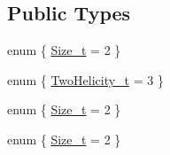 \subsection*{Public Types}
\begin{DoxyCompactItemize}
\item 
enum \{ \mbox{\hyperlink{structHadron_1_1H3o2D2ERep_a9bf2e83b58c37ceb1f68491e5a7ead5ba92532a2b7481ec95515a2df584e86ca4}{Size\+\_\+t}} = 2
 \}
\item 
enum \{ \mbox{\hyperlink{structHadron_1_1H3o2D2ERep_a05a251abdfef1dbb8a275c7a9eaf3e92ac3ea37791247cfd524ba0da345f53c66}{Two\+Helicity\+\_\+t}} = 3
 \}
\item 
enum \{ \mbox{\hyperlink{structHadron_1_1H3o2D2ERep_a9bf2e83b58c37ceb1f68491e5a7ead5ba92532a2b7481ec95515a2df584e86ca4}{Size\+\_\+t}} = 2
 \}
\item 
enum \{ \mbox{\hyperlink{structHadron_1_1H3o2D2ERep_a9bf2e83b58c37ceb1f68491e5a7ead5ba92532a2b7481ec95515a2df584e86ca4}{Size\+\_\+t}} = 2
 \}
\end{DoxyCompactItemize}
